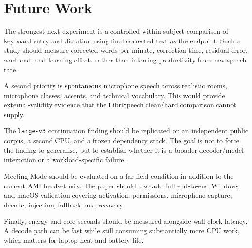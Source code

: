 \section{Future Work}

The strongest next experiment is a controlled within-subject comparison of keyboard entry and
\YazSes{} dictation using final corrected text as the endpoint. Such a study should measure
corrected words per minute, correction time, residual error, workload, and learning effects rather
than inferring productivity from raw speech rate.

A second priority is spontaneous microphone speech across realistic rooms, microphone classes,
accents, and technical vocabulary. This would provide external-validity evidence that the
LibriSpeech clean/hard comparison cannot supply.

The \texttt{large-v3} continuation finding should be replicated on an independent public corpus,
a second CPU, and a frozen dependency stack. The goal is not to force the finding to generalize,
but to establish whether it is a broader decoder/model interaction or a workload-specific
failure.

Meeting Mode should be evaluated on a far-field condition in addition to the current AMI headset
mix. The paper should also add full end-to-end Windows and macOS validation covering activation,
permissions, microphone capture, decode, injection, fallback, and recovery.

Finally, energy and core-seconds should be measured alongside wall-clock latency. A decode path
can be fast while still consuming substantially more CPU work, which matters for laptop heat and
battery life.
